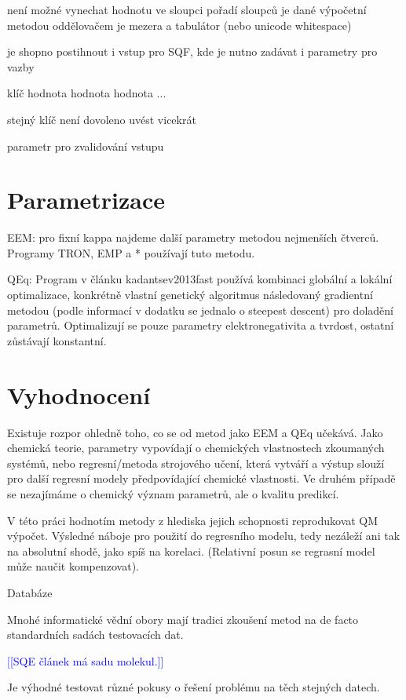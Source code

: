 \documentclass[10pt,draft,oneside]{fithesis2}
\newcommand\todo[1]{\textcolor{blue}{[[#1]]}}
\begin{document}
není možné vynechat hodnotu ve sloupci
pořadí sloupců je dané výpočetní metodou
oddělovačem je mezera a tabulátor (nebo unicode whitespace)

je shopno postihnout i vstup pro SQF, kde je nutno zadávat i parametry pro vazby

klíč hodnota hodnota hodnota ...

stejný klíč není dovoleno uvést vicekrát

parametr pro zvalidování vstupu


\chapter{Parametrizace}

EEM: pro fixní kappa najdeme další parametry metodou nejmenších čtverců. Programy TRON, EMP a * používají tuto metodu.

QEq: Program v článku kadantsev2013fast používá kombinaci globální a lokální optimalizace, konkrétně vlastní genetický algoritmus následovaný gradientní metodou (podle informací v dodatku se jednalo o steepest descent) pro doladění parametrů. Optimalizují se pouze parametry elektronegativita a tvrdost, ostatní zůstávají konstantní.

\chapter{Vyhodnocení}

Existuje rozpor ohledně toho, co se od metod jako EEM a QEq učekává. Jako chemická teorie, parametry vypovídají o chemických vlastnostech zkoumaných systémů, nebo regresní/metoda strojového učení, která vytváří a výstup slouží pro další regresní modely předpovídající chemické vlastnosti. Ve druhém případě se nezajímáme o chemický význam parametrů, ale o kvalitu predikcí.

V této práci hodnotím metody z hlediska jejich schopnosti reprodukovat QM výpočet. Výsledné náboje pro použití do regresního modelu, tedy nezáleží ani tak na absolutní shodě, jako spíš na korelaci. (Relativní posun se regrasní model může naučit kompenzovat).

Databáze

Mnohé informatické vědní obory mají tradici zkoušení metod na de facto standardních sadách testovacích dat.

\todo{SQE článek má sadu molekul.}

Je výhodné testovat různé pokusy o řešení problému na těch stejných datech.
\end{document}
